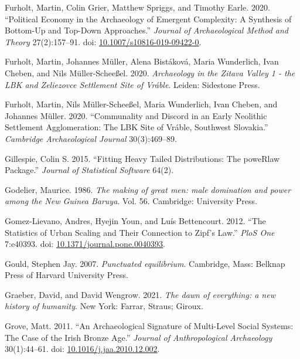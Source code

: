\documentclass[
  12pt,
]{book}
\newlength{\cslhangindent}
\newlength{\cslentryspacingunit} %
\newenvironment{CSLReferences}[2] %
 {%
  \setlength{\parindent}{0pt}
  \ifodd #1
  \let\oldpar\par
  \def\par{\hangindent=\cslhangindent\oldpar}
  \fi
  \setlength{\parskip}{#2\cslentryspacingunit}
 }%
 {}
\begin{document}
\begin{CSLReferences}{1}{0}
\leavevmode{}%
Furholt, Martin, Colin Grier, Matthew Spriggs, and Timothy Earle. 2020. {``Political Economy in the Archaeology of Emergent Complexity: A Synthesis of Bottom-Up and Top-Down Approaches.''} \emph{Journal of Archaeological Method and Theory} 27(2):157--91. doi: \href{https://doi.org/10.1007/s10816-019-09422-0}{10.1007/s10816-019-09422-0}.

\leavevmode{}%
Furholt, Martin, Johannes Müller, Alena Bistáková, Maria Wunderlich, Ivan Cheben, and Nils Müller-Scheeßel. 2020. \emph{Archaeology in the Zitava Valley 1 - the LBK and Zeliezovce Settlement Site of Vráble}. Leiden: Sidestone Press.

\leavevmode{}%
Furholt, Martin, Nils Müller-Scheeßel, Maria Wunderlich, Ivan Cheben, and Johannes Müller. 2020. {``Communality and Discord in an Early Neolithic Settlement Agglomeration: The LBK Site of Vráble, Southwest Slovakia.''} \emph{Cambridge Archaeological Journal} 30(3):469--89.

\leavevmode{}%
Gillespie, Colin S. 2015. {``Fitting Heavy Tailed Distributions: The poweRlaw Package.''} \emph{Journal of Statistical Software} 64(2).

\leavevmode{}%
Godelier, Maurice. 1986. \emph{The making of great men: male domination and power among the New Guinea Baruya}. Vol. 56. Cambridge: University Press.

\leavevmode{}%
Gomez-Lievano, Andres, Hyejin Youn, and Luís Bettencourt. 2012. {``The Statistics of Urban Scaling and Their Connection to Zipf{'}s Law.''} \emph{PloS One} 7:e40393. doi: \href{https://doi.org/10.1371/journal.pone.0040393}{10.1371/journal.pone.0040393}.

\leavevmode{}%
Gould, Stephen Jay. 2007. \emph{Punctuated equilibrium}. Cambridge, Mass: Belknap Press of Harvard University Press.

\leavevmode{}%
Graeber, David, and David Wengrow. 2021. \emph{The dawn of everything: a new history of humanity}. New York: Farrar, Straus; Giroux.

\leavevmode{}%
Grove, Matt. 2011. {``An Archaeological Signature of Multi-Level Social Systems: The Case of the Irish Bronze Age.''} \emph{Journal of Anthropological Archaeology} 30(1):44--61. doi: \href{https://doi.org/10.1016/j.jaa.2010.12.002}{10.1016/j.jaa.2010.12.002}.


\end{CSLReferences}
\end{document}
